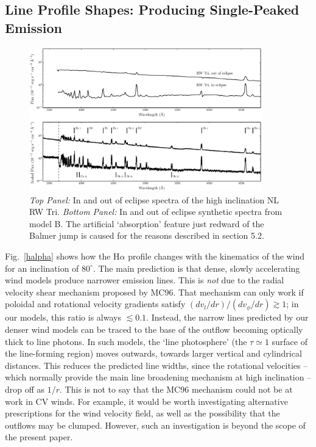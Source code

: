 \documentclass[preprint, a4paper, 11pt]{aastex}
\begin{document}
\subsection{Line Profile Shapes: Producing Single-Peaked Emission}

\begin{figure} %
\includegraphics[width=0.9\textwidth]{figures/fig13_eclipse.eps}
\caption{{\sl Top Panel:} In and out of eclipse spectra of the high
inclination NL RW Tri. {\sl Bottom Panel:} In and out of eclipse synthetic
spectra from model B.
The artificial `absorption' feature just redward of the Balmer jump
is caused for the reasons described in section 5.2.}
\label{rwtricomp}
\end{figure} %


Fig.~\ref{halpha} shows how the H$\alpha$ profile changes with the kinematics of the wind for 
an inclination of $80^\circ$. The main prediction is that dense, slowly accelerating 
wind models produce narrower emission lines. This is {\em not} due to the radial 
velocity shear mechanism proposed by MC96. That mechanism can only work if poloidal 
and rotational velocity gradients satisfy $(dv_l/dr)/(dv_\phi/dr) \gtrsim 1$; in 
our models, this ratio is always $\lesssim 0.1$. Instead, the narrow lines predicted 
by our denser wind models can be traced to the base of the outflow becoming optically 
thick to line photons. In such models, the `line photosphere'
(the $\tau \simeq 1$ surface of the line-forming region) moves outwards, towards larger 
vertical and cylindrical distances. This reduces the predicted line widths, since the 
rotational velocities -- which normally provide the main line broadening mechanism at 
high inclination -- drop off as $1/r$. This is not to say that the MC96 
mechanism could not be at work in CV winds. For example, it would be worth investigating
alternative prescriptions for the wind velocity field, as well as the possibility that the 
outflows may be clumped. However, such an investigation is beyond the scope of the present paper.
\end{document}
